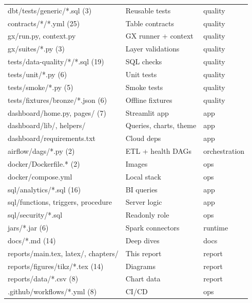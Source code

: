 \begin{center}
\begin{longtable}{>{\ttfamily\scriptsize\raggedright\arraybackslash}p{5.2cm} >{\sffamily\scriptsize\raggedright\arraybackslash}p{6.4cm} >{\sffamily\scriptsize}l}
dbt/tests/generic/*.sql (3) & Reusable tests & quality \\
contracts/*/*.yml (25) & Table contracts & quality \\
gx/run.py, context.py & GX runner + context & quality \\
gx/suites/*.py (3) & Layer validations & quality \\
tests/data-quality/*/*.sql (19) & SQL checks & quality \\
tests/unit/*.py (6) & Unit tests & quality \\
tests/smoke/*.py (5) & Smoke tests & quality \\
tests/fixtures/bronze/*.json (6) & Offline fixtures & quality \\
dashboard/home.py, pages/ (7) & Streamlit app & app \\
dashboard/lib/, helpers/ & Queries, charts, theme & app \\
dashboard/requirements.txt & Cloud deps & app \\
airflow/dags/*.py (2) & ETL + health DAGs & orchestration \\
docker/Dockerfile.* (2) & Images & ops \\
docker/compose.yml & Local stack & ops \\
sql/analytics/*.sql (16) & BI queries & app \\
sql/functions, triggers, procedure & Server logic & app \\
sql/security/*.sql & Readonly role & ops \\
jars/*.jar (6) & Spark connectors & runtime \\
docs/*.md (14) & Deep dives & docs \\
reports/main.tex, latex/, chapters/ & This report & report \\
reports/figures/tikz/*.tex (14) & Diagrams & report \\
reports/data/*.csv (8) & Chart data & report \\
.github/workflows/*.yml (8) & CI/CD & ops \\
\bottomrule
\end{longtable}
\end{center}
